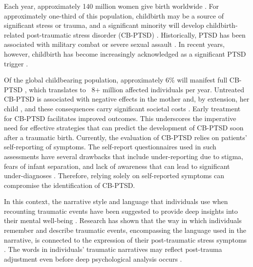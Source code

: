 \documentclass[bst/sn-nature]{sn-jnl}%
\theoremstyle{thmstyleone}%
\theoremstyle{thmstyletwo}%
\theoremstyle{thmstylethree}%
\begin{document}
Each year, approximately 140 million women give birth worldwide \cite{sommerlad2021trait}. 
For approximately one-third of this population, childbirth may be a source of significant stress or trauma, and a significant minority will develop childbirth-related post-traumatic stress disorder (CB-PTSD) \cite{dekel2020beyond}.
Historically, PTSD has been associated with military combat or severe sexual assault \cite{dekel2016trauma}. 
In recent years, however, childbirth has become increasingly acknowledged as a significant PTSD trigger \cite{dekel2020beyond,yildiz2017prevalence}.

Of the global childbearing population, approximately 6\% will manifest full CB-PTSD \cite{yildiz2017prevalence}, which translates to ~8+ million affected individuals per year. Untreated CB-PTSD is associated with negative effects in the mother and, by extension, her child \cite{van2022childbirth,dekel2019childbirth}, and these consequences carry significant societal costs \cite{lyons2022developmental,luca2019societal}. Early treatment for CB-PTSD facilitates improved outcomes.
This underscores the imperative need for effective strategies that can predict the development of CB-PTSD soon after a traumatic birth.
Currently, the evaluation of CB-PTSD relies on patients' self-reporting of symptoms.
The self-report questionnaires used in such assessments have several drawbacks that include under-reporting due to stigma, fears of infant separation, and lack of awareness that can lead to significant under-diagnoses \cite{anokye2018prevalence, jones2022postpartum}.
Therefore, relying solely on self-reported symptoms can compromise the identification of CB-PTSD.

In this context, the narrative style and language that individuals use when recounting traumatic events have been suggested to provide deep insights into their mental well-being \cite{vanaken2021keep,boyd2017multifaceted,alvarez2001linguistic}.
Research has shown that the way in which individuals remember and describe traumatic events, encompassing the language used in the narrative, is connected to the expression of their post-traumatic stress symptoms \cite{crespo2016memory}.
The words in individuals' traumatic narratives may reflect post-trauma adjustment even before deep psychological analysis occurs \cite{o2006trauma}.
\end{document}
